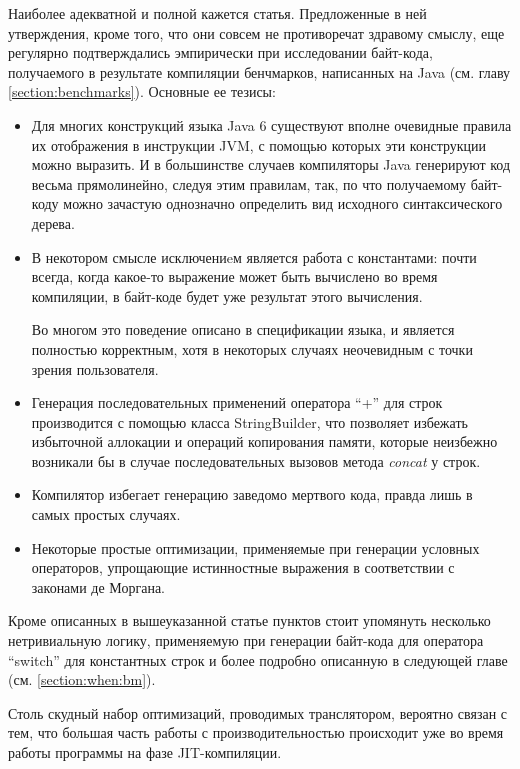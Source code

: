 Наиболее адекватной и полной кажется статья\cite{JavacOT}.
Предложенные в ней утверждения, кроме того, что они совсем не противоречат здравому смыслу,
еще регулярно подтверждались эмпирически при исследовании байт-кода, получаемого в результате
компиляции бенчмарков, написанных на Java (см. главу \ref{section:benchmarks}).
Основные ее тезисы:
\begin{itemize}
    \item Для многих конструкций языка Java 6 существуют вполне очевидные правила их отображения
    в инструкции JVM, с помощью которых эти конструкции можно выразить.
    И в большинстве случаев компиляторы Java генерируют код весьма прямолинейно, следуя этим
    правилам, так, по что получаемому байт-коду можно зачастую однозначно определить вид исходного
    синтаксического дерева.
    \item В некотором смысле исключениeм является работа с константами:
    почти всегда, когда какое-то выражение может быть вычислено во время компиляции, в байт-коде
    будет уже результат этого вычисления.

    Во многом это поведение описано в спецификации языка, и является полностью корректным,
    хотя в некоторых случаях неочевидным с точки зрения пользователя.

    \item Генерация последовательных применений оператора ``+'' для строк производится с помощью
    класса StringBuilder, что позволяет избежать избыточной аллокации и операций копирования памяти,
    которые неизбежно возникали бы в случае последовательных вызовов метода \textit{concat} у строк.

    \item Компилятор избегает генерацию заведомо мертвого кода, правда лишь в самых простых случаях.

    \item Некоторые простые оптимизации, применяемые при генерации условных операторов, упрощающие
    истинностные выражения в соответствии с законами де Моргана.
\end{itemize}

Кроме описанных в вышеуказанной статье пунктов стоит упомянуть несколько нетривиальную логику,
применяемую при генерации байт-кода для оператора ``switch'' для константных строк и более подробно
описанную в следующей главе (см. \ref{section:when:bm}).

Столь скудный набор оптимизаций, проводимых транслятором, вероятно связан с тем, что большая часть
работы с производительностью происходит уже во время работы программы на фазе JIT-компиляции.

